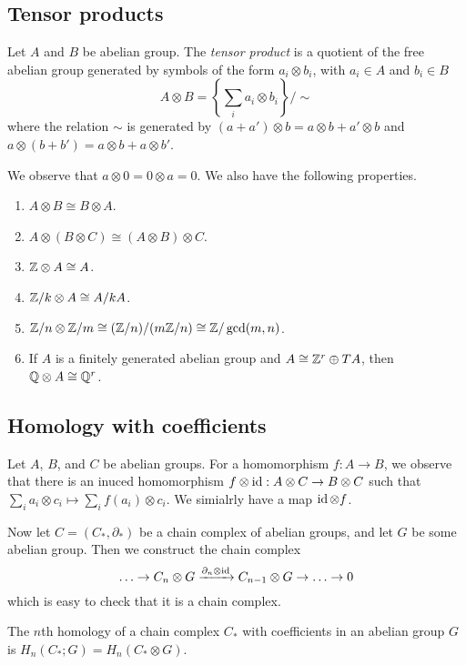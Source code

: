 \subsection{Tensor products}

\begin{definition}
  Let $A$ and $B$ be abelian group. The \emph{tensor product} is a quotient of the free abelian group generated by symbols of the form $a_i \otimes b_i$, with $a_i \in A$ and $b_i \in B$
  \[A \otimes B = \left\{
    \sum_i a_i \otimes b_i
    \right\}/{\sim}\]
  where the relation $\sim$ is generated by $(a + a') \otimes b = a \otimes b + a' \otimes b$ and $a \otimes (b + b') = a \otimes b + a \otimes b'$.
\end{definition}

We observe that $a \otimes 0 = 0 \otimes a = 0$. We also have the following properties.

\begin{enumerate}
  \item $A \otimes B \cong B \otimes A$.
  \item $A \otimes (B \otimes C) \cong (A \otimes B) \otimes C$.
  \item $\mathbb{Z} \otimes A \cong A$.
  \item $\mathbb{Z}/k \otimes A \cong A/kA$.
  \item $\mathbb{Z}/n \otimes \mathbb{Z}/m \cong (\mathbb{Z}/n)/(m\mathbb{Z}/n) \cong \mathbb{Z}/\gcd(m,n)$.
  \item If $A$ is a finitely generated abelian group and $A \cong \mathbb{Z}^r \oplus TA$, then $\mathbb{Q} \otimes A \cong \mathbb{Q}^r$.
\end{enumerate}

\subsection{Homology with coefficients}

Let $A$, $B$, and $C$ be abelian groups. For a homomorphism $f: A \to B$, we observe that there is an inuced homomorphism $f \otimes \operatorname{id}: A \otimes C \to B \otimes C$ such that $\sum_i a_i \otimes c_i \mapsto \sum_i f(a_i) \otimes c_i$. We simialrly have a map $\operatorname{id} \otimes f$.

Now let $C = (C_*, \partial_*)$ be a chain complex of abelian groups, and let $G$ be some abelian group. Then we construct the chain complex
\[
  \ldots \to C_n \otimes G \xrightarrow[]{\partial_n \otimes \operatorname{id}} C_{n-1} \otimes G \to \ldots \to 0
\]
which is easy to check that it is a chain complex.

\begin{definition}
  The $n$th homology of a chain complex $C_*$ with coefficients in an abelian group $G$ is $H_n(C_*; G) = H_n(C_* \otimes G)$.
\end{definition}

